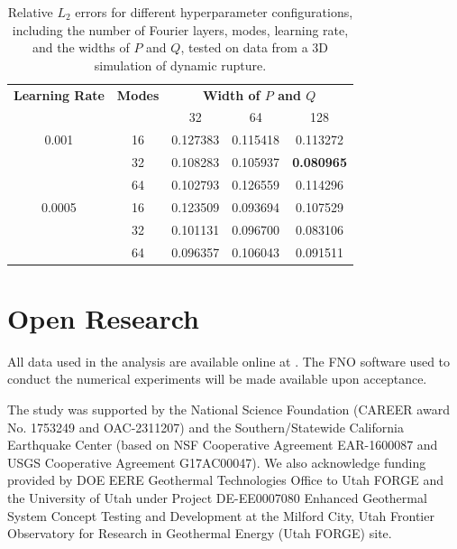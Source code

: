\documentclass[draft]{agujournal2019}
\begin{document}
\begin{table}[ht!]
\caption{Relative \( L_2 \) errors for different hyperparameter configurations, including the number of Fourier layers, modes, learning rate, and the widths of \( P \) and \( Q \), tested on data from a 3D simulation of dynamic rupture.}
    \centering
    \begin{tabular}{ccccc}
        \toprule
        \textbf{Learning Rate} & \textbf{Modes} & \multicolumn{3}{c}{\textbf{Width of \(P\) and \(Q\)}} \\
        \cmidrule(lr){3-5}
        & & 32 & 64 & 128 \\
        \midrule
        0.001  & 16  & 0.127383 & 0.115418 & 0.113272  \\
               & 32  & 0.108283 & 0.105937 & \textbf{0.080965}  \\
               & 64  & 0.102793 & 0.126559 & 0.114296  \\
        0.0005 & 16  & 0.123509 & 0.093694  & 0.107529  \\
               & 32  & 0.101131 & 0.096700  & 0.083106  \\
               & 64  & 0.096357 & 0.106043 & 0.091511 \\
        \bottomrule
    \end{tabular}
    \label{tab:3D_hyperparam}
\end{table}


\section*{Open Research}
All data used in the analysis are available online at . The FNO software used to conduct the numerical experiments will be made available upon acceptance.




\acknowledgments
The study was supported by the National Science Foundation (CAREER award No. 1753249 and OAC-2311207) and the Southern/Statewide California Earthquake Center (based on NSF Cooperative Agreement EAR-1600087 and USGS Cooperative Agreement G17AC00047). We also acknowledge funding provided by DOE EERE Geothermal Technologies Office to Utah FORGE and the University of Utah under Project DE-EE0007080 Enhanced Geothermal System Concept Testing and Development at the Milford City, Utah Frontier Observatory for Research in Geothermal Energy (Utah FORGE) site.



\end{document}
